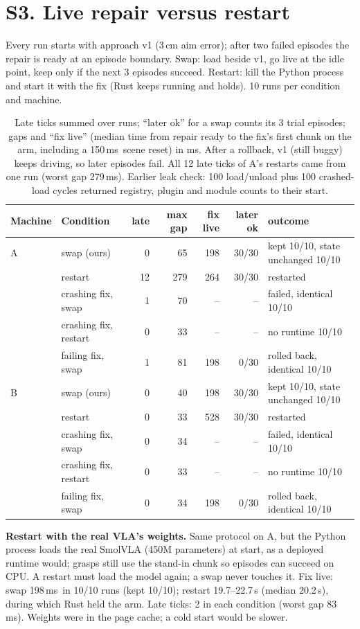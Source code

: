 \documentclass[10pt,letterpaper]{article}
\newcommand{\ms}{\,ms}
\begin{document}
\section*{S3. Live repair versus restart}
Every run starts with approach v1 (3\,cm aim error); after two failed episodes the repair is ready at an episode boundary. Swap: load beside v1, go live at the idle point, keep only if the next 3 episodes succeed. Restart: kill the Python process and start it with the fix (Rust keeps running and holds). 10 runs per condition and machine.

\begin{table}[h]
\centering\small
\begin{tabular}{llrrrrl}
\toprule
Machine & Condition & late & max gap & fix live & later ok & outcome\\
\midrule
A & swap (ours) & 0 & 65 & 198 & 30/30 & kept 10/10, state unchanged 10/10\\
 & restart & 12 & 279 & 264 & 30/30 & restarted\\
 & crashing fix, swap & 1 & 70 & -- & -- & failed, identical 10/10\\
 & crashing fix, restart & 0 & 33 & -- & -- & no runtime 10/10\\
 & failing fix, swap & 1 & 81 & 198 & 0/30 & rolled back, identical 10/10\\
\midrule
B & swap (ours) & 0 & 40 & 198 & 30/30 & kept 10/10, state unchanged 10/10\\
 & restart & 0 & 33 & 528 & 30/30 & restarted\\
 & crashing fix, swap & 0 & 34 & -- & -- & failed, identical 10/10\\
 & crashing fix, restart & 0 & 33 & -- & -- & no runtime 10/10\\
 & failing fix, swap & 0 & 34 & 198 & 0/30 & rolled back, identical 10/10\\
\bottomrule
\end{tabular}
\caption{Late ticks summed over runs; ``later ok'' for a swap counts its 3 trial episodes; gaps and ``fix live'' (median time from repair ready to the fix's first chunk on the arm, including a 150\ms\ scene reset) in ms. After a rollback, v1 (still buggy) keeps driving, so later episodes fail. All 12 late ticks of A's restarts came from one run (worst gap 279\ms). Earlier leak check: 100 load/unload plus 100 crashed-load cycles returned registry, plugin and module counts to their start.}
\end{table}

\textbf{Restart with the real VLA's weights.} Same protocol on A, but the Python process loads the real SmolVLA (450M parameters) at start, as a deployed runtime would; grasps still use the stand-in chunk so episodes can succeed on CPU. A restart must load the model again; a swap never touches it. Fix live: swap 198\ms\ in 10/10 runs (kept 10/10); restart 19.7--22.7\,s (median 20.2\,s), during which Rust held the arm. Late ticks: 2 in each condition (worst gap 83\ms). Weights were in the page cache; a cold start would be slower.
\end{document}
